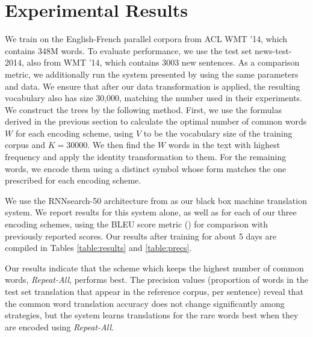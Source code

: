 \section{Experimental Results}
\label{sec:exp}

We train on the English-French parallel corpora from ACL WMT '14, which contains
348M words. To evaluate performance, we use the test set news-test-2014, also from
WMT '14, which contains 3003 new sentences. As a comparison metric, we additionally run the system presented by
 using the same parameters and data. We ensure
that after our data transformation is applied, the resulting vocabulary also has size
30,000, matching the number used in their experiments. We construct the trees by the following method. First, we use
the formulas derived in the previous section to calculate the optimal number of
common words $W$ for each encoding scheme, using $V$ to be the vocabulary size of the training corpus and $K = 30000$.
We then find the $W$ words in the text with highest frequency and
apply the identity transformation to them. For the remaining words, we encode them
using a distinct symbol whose form matches the one prescribed for each
encoding scheme.

We use the RNNsearch-50 architecture from  as
our black box machine translation system. We report results for this system alone,
as well as for each of our three encoding schemes, using the BLEU score metric () for
comparison with previously reported scores. Our results after training
for about 5 days are compiled in Tables \ref{table:results} and \ref{table:precs}.

Our results indicate that the scheme which keeps the highest number of common words, \emph{Repeat-All},
performs best. The precision values (proportion of words in the test set translation that appear in the
reference corpus, per sentence) reveal that the common word translation accuracy does not change significantly
among strategies, but the system learns translations for the rare words best when they are encoded
using \emph{Repeat-All}.

\begin{table}
  \centering
  \vspace{8pt}
  \caption{BLEU scores on detokenized test set for various encoding
    schemes after training for 5 days.}
  \label{table:results}
\end{table}


